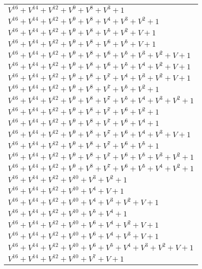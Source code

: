\documentclass[12pt]{article}
\begin{document}
\begin{adjustwidth}{-4cm}{}
\begin{center}
\begin{longtable}{|l|}
$V^{16}  +V^{14}  +V^{12}  +V^{9}  +V^{8}  +V^{3}  + 1$ \\
$V^{16}  +V^{14}  +V^{12}  +V^{9}  +V^{8}  +V^{4}  +V^{3}  +V^{2}  + 1$ \\
$V^{16}  +V^{14}  +V^{12}  +V^{9}  +V^{8}  +V^{5}  +V^{2}  + V + 1$ \\
$V^{16}  +V^{14}  +V^{12}  +V^{9}  +V^{8}  +V^{6}  +V^{5}  + V + 1$ \\
$V^{16}  +V^{14}  +V^{12}  +V^{9}  +V^{8}  +V^{6}  +V^{5}  +V^{3}  +V^{2}  + V + 1$ \\
$V^{16}  +V^{14}  +V^{12}  +V^{9}  +V^{8}  +V^{6}  +V^{5}  +V^{4}  +V^{2}  + V + 1$ \\
$V^{16}  +V^{14}  +V^{12}  +V^{9}  +V^{8}  +V^{7}  +V^{4}  +V^{3}  +V^{2}  + V + 1$ \\
$V^{16}  +V^{14}  +V^{12}  +V^{9}  +V^{8}  +V^{7}  +V^{5}  +V^{2}  + 1$ \\
$V^{16}  +V^{14}  +V^{12}  +V^{9}  +V^{8}  +V^{7}  +V^{5}  +V^{4}  +V^{3}  +V^{2}  + 1$ \\
$V^{16}  +V^{14}  +V^{12}  +V^{9}  +V^{8}  +V^{7}  +V^{6}  +V^{2}  + 1$ \\
$V^{16}  +V^{14}  +V^{12}  +V^{9}  +V^{8}  +V^{7}  +V^{6}  +V^{4}  + 1$ \\
$V^{16}  +V^{14}  +V^{12}  +V^{9}  +V^{8}  +V^{7}  +V^{6}  +V^{4}  +V^{3}  + V + 1$ \\
$V^{16}  +V^{14}  +V^{12}  +V^{9}  +V^{8}  +V^{7}  +V^{6}  +V^{5}  + 1$ \\
$V^{16}  +V^{14}  +V^{12}  +V^{9}  +V^{8}  +V^{7}  +V^{6}  +V^{5}  +V^{3}  +V^{2}  + 1$ \\
$V^{16}  +V^{14}  +V^{12}  +V^{9}  +V^{8}  +V^{7}  +V^{6}  +V^{5}  +V^{4}  +V^{2}  + 1$ \\
$V^{16}  +V^{14}  +V^{12}  +V^{10}  +V^{3}  +V^{2}  + 1$ \\
$V^{16}  +V^{14}  +V^{12}  +V^{10}  +V^{4}  + V + 1$ \\
$V^{16}  +V^{14}  +V^{12}  +V^{10}  +V^{4}  +V^{3}  +V^{2}  + V + 1$ \\
$V^{16}  +V^{14}  +V^{12}  +V^{10}  +V^{5}  +V^{4}  + 1$ \\
$V^{16}  +V^{14}  +V^{12}  +V^{10}  +V^{6}  +V^{4}  +V^{2}  + V + 1$ \\
$V^{16}  +V^{14}  +V^{12}  +V^{10}  +V^{6}  +V^{4}  +V^{3}  + V + 1$ \\
$V^{16}  +V^{14}  +V^{12}  +V^{10}  +V^{6}  +V^{5}  +V^{4}  +V^{3}  +V^{2}  + V + 1$ \\
$V^{16}  +V^{14}  +V^{12}  +V^{10}  +V^{7}  + V + 1$ \\

\end{longtable}
\end{center}
\end{adjustwidth}
\end{document}
